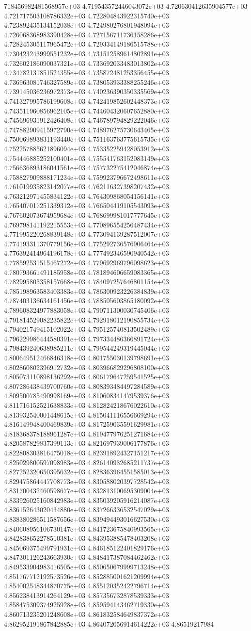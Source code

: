 718456982481568957e+03	4.719543572446043072e+03	4.720630412635904577e+03	4.721717503108786332e+03	4.722804843922315740e+03	4.723892435134152038e+03	4.724980276801948094e+03	4.726068368983390428e+03	4.727156711736158286e+03	4.728245305117965472e+03	4.729334149186515788e+03	4.730423243999551232e+03	4.731512589614802891e+03	4.732602186090037321e+03	4.733692033483013802e+03	4.734782131851524355e+03	4.735872481253356455e+03	4.736963081746327589e+03	4.738053933388255246e+03	4.739145036236972373e+03	4.740236390350335569e+03	4.741327995786199608e+03	4.742419852602448373e+03	4.743511960856962105e+03	4.744604320607652880e+03	4.745696931912426408e+03	4.746789794829222046e+03	4.747882909415972790e+03	4.748976275730643465e+03	4.750069893831193440e+03	4.751163763775615735e+03	4.752257885621896094e+03	4.753352259428053912e+03	4.754446885252100401e+03	4.755541763152083149e+03	4.756636893186041561e+03	4.757732275412046874e+03	4.758827909888171234e+03	4.759923796672498611e+03	4.761019935823142077e+03	4.762116327398207432e+03	4.763212971455834122e+03	4.764309868054156141e+03	4.765407017251339312e+03	4.766504419105543093e+03	4.767602073674959684e+03	4.768699981017777645e+03	4.769798141192215553e+03	4.770896554256487434e+03	4.771995220268839148e+03	4.773094139287512007e+03	4.774193311370779156e+03	4.775292736576906464e+03	4.776392414964196178e+03	4.777492346590940542e+03	4.778592531515467272e+03	4.779692969796098623e+03	4.780793661491185958e+03	4.781894606659083365e+03	4.782995805358157668e+03	4.784097257646801154e+03	4.785198963583403383e+03	4.786300923226384839e+03	4.787403136634161456e+03	4.788505603865180092e+03	4.789608324977883058e+03	4.790711300030745406e+03	4.791814529082235822e+03	4.792918012190855734e+03	4.794021749415102022e+03	4.795125740813502489e+03	4.796229986444580391e+03	4.797334486366891724e+03	4.798439240638985211e+03	4.799544249319445044e+03	4.800649512466846318e+03	4.801755030139798691e+03	4.802860802396912732e+03	4.803966829296808100e+03	4.805073110898136292e+03	4.806179647259541525e+03	4.807286438439700760e+03	4.808393484497284589e+03	4.809500785490998169e+03	4.810608341479539376e+03	4.811716152521638833e+03	4.812824218676022610e+03	4.813932540001448615e+03	4.815041116556669294e+03	4.816149948400469839e+03	4.817259035591629981e+03	4.818368378188961287e+03	4.819477976251271684e+03	4.820587829837399113e+03	4.821697939006177876e+03	4.822808303816475018e+03	4.823918924327151217e+03	4.825029800597098983e+03	4.826140932685211737e+03	4.827252320650395632e+03	4.828363964551585013e+03	4.829475864447708773e+03	4.830588020397728542e+03	4.831700432460598677e+03	4.832813100695309004e+03	4.833926025160842983e+03	4.835039205916214087e+03	4.836152643020434880e+03	4.837266336532547029e+03	4.838380286511587656e+03	4.839494493016627530e+03	4.840608956106730147e+03	4.841723675840993565e+03	4.842838652278510381e+03	4.843953885478403208e+03	4.845069375499791931e+03	4.846185122401829176e+03	4.847301126243663930e+03	4.848417387084462462e+03	4.849533904983416505e+03	4.850650679999713248e+03	4.851767712192573526e+03	4.852885001621209994e+03	4.854002548344870775e+03	4.855120352422796714e+03	4.856238413914264129e+03	4.857356732878539333e+03	4.858475309374925928e+03	4.859594143462719330e+03	4.860713235201248608e+03	4.861832584649837372e+03	4.862952191867842885e+03	4.864072056914614222e+03	4.86519217984